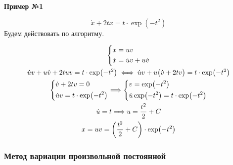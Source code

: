 \documentclass[a4paper,12pt]{article}
\newcommand{\du}{\dot{u}}
\renewcommand{\dv}{\dot{v}}
\newcommand{\dx}{\dot{x}}
\begin{document}
\textbf{Пример №1}

\[\dx +2tx = t\cdot \exp(-t^2)\]
Будем действовать по алгоритму.

\begin{gather*}
	\left\{\begin{gathered}
	x = uv\hfill\\
	\dx = \du v + u\dv\hfill
	\end{gathered}\right.\\
	\du v + u\dv + 2tuv = t\cdot \exp(-t^2) \iff \du v + u\big(\dv + 2tv\big) = t\cdot \exp(-t^2)\\
	\left\{\begin{gathered}
	\dv + 2tv = 0\hfill\\
	\du v = t\cdot \exp(-t^2)\hfill
	\end{gathered}\right. \Longrightarrow
	\left\{\begin{gathered}
	v = \exp(-t^2)\hfill\\
	\du \exp(-t^2) = t\cdot \exp(-t^2)\hfill
	\end{gathered}\right. \\
	\du = t \Longrightarrow u = \dfrac{t^2}{2} + C\\
	x = uv = \left(\dfrac{t^2}{2} + C\right)\cdot \exp(-t^2)
\end{gather*}

\subsubsection{Метод вариации произвольной постоянной}
\end{document}

